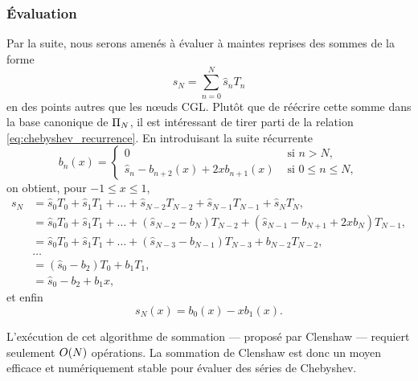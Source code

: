 \subsubsection{Évaluation}
Par la suite, nous serons amenés à évaluer à maintes reprises des sommes de la forme
\begin{equation}
	s_N = \sum_{n=0}^N \hat{s}_n T_n
	\label{eq:chebyshev_sum}
\end{equation}
en des points autres que les n\oe uds CGL.
Plutôt que de réécrire cette somme dans la base canonique de $\Pi_{N}$, il est intéressant de tirer parti de la relation \eqref{eq:chebyshev_recurrence}. 
En introduisant la suite récurrente
\begin{equation}
	b_n(x) = 
	\begin{cases}
	 0 & \text{\ si\ } n > N,   \\ 
	 \hat{s}_n - b_{n+2}(x) + 2x b_{n+1}(x) & \text{\ si\ } 0 \leq n \leq N,
	\end{cases}
\end{equation}
on obtient, pour $-1 \leq x \leq 1$,%
\def\px{}%
\begin{align*}
	s_N\px 
	&= \hat{s}_0 T_0\px + \hat{s}_1 T_1\px + \ldots + \hat{s}_{N-2} T_{N-2}\px + \hat{s}_{N-1} T_{N-1}\px + \hat{s}_N T_N\px, \\
	&= \hat{s}_0 T_0 \px
	+ \hat{s}_1 T_1 \px
	+ \ldots 
	+ \left(\hat{s}_{N-2} - b_{N}\px\right) T_{N-2} \px
	+ \left(\hat{s}_{N-1} - b_{N+1}\px + 2x b_{N}\px \right) T_{N-1}\px, \\
	&= \hat{s}_0 T_0 \px
	+ \hat{s}_1 T_1 \px
	+ \ldots 
	+ \left(\hat{s}_{N-3} - b_{N-1}\px\right) T_{N-3} \px
	+ b_{N-2}\px T_{N-2}\px, \\
	& \ldots\\
	&= \left( \hat{s}_0 - b_2\px \right) T_0\px + b_1\px T_1\px, \\
	&= \hat{s}_0 - b_2\px + b_1\px x,
\end{align*}
et enfin
\begin{equation}
	s_N(x) = b_0(x) - x b_1(x).
\end{equation}

L'exécution de cet algorithme de sommation --- proposé par Clenshaw \cite{clenshaw1955} --- requiert seulement $O\!\left( {N} \right)$ opérations. %
La sommation de Clenshaw est donc un moyen efficace et numériquement stable pour évaluer des séries de Chebyshev.


